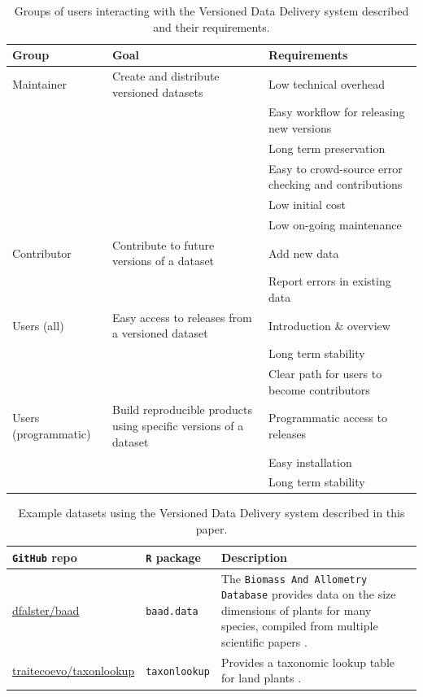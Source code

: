\documentclass[a4paper,11pt]{article}
\newcommand{\ghsmurl}[1]{{\footnotesize\href{https://github.com/#1}{#1}}}
\begin{document}
\begin{table}[h!]
\centering
\caption{Groups of users interacting with the Versioned Data Delivery system described and their requirements.}
{\footnotesize
\vspace{1cm}
  \begin{tabular}{p{2cm}p{5cm}p{7cm}}
  \hline
  \textbf{Group} & \textbf{Goal} & \textbf{Requirements} \\ \hline
  Maintainer & Create and distribute versioned datasets & Low technical overhead \\
    & & Easy workflow for releasing new versions \\
    & & Long term preservation \\
    & & Easy to crowd-source error checking and contributions \\
    & & Low initial cost \\
    & & Low on-going maintenance \\
  Contributor & Contribute to future versions of a dataset & Add new data \\
    & & Report errors in existing data  \\
  Users (all) & Easy access to releases from a versioned dataset & Introduction \& overview \\
    & & Long term stability \\
    & & Clear path for users to become contributors \\
  Users (programmatic) & Build reproducible products using specific versions of a dataset & Programmatic access to releases\\
    & & Easy installation\\
    & & Long term stability \\
  \hline
  \end{tabular}
}
\label{tab:user_requirements}
\end{table}

\newpage

\begin{table}[h!]
\centering
\caption{Example datasets using the Versioned Data Delivery system described in this paper.}
{\footnotesize
\vspace{1cm}

  \begin{tabular}{p{3.5cm}p{3cm}p{7cm}}
  \hline
   \textbf{\texttt{GitHub} repo} & \textbf{\texttt{R} package} & \textbf{Description} \\ \hline
  \ghsmurl{dfalster/baad} & \texttt{baad.data} & The \texttt{Biomass And Allometry Database} provides data on the size dimensions of plants for many species, compiled from multiple scientific papers \citep{Falster-2015}.\\
  \ghsmurl{traitecoevo/taxonlookup} & \texttt{taxonlookup} & Provides a taxonomic lookup table for land plants \citep{Pennell-2015a}.\\
  \hline
  \end{tabular}
  }
\label{tab:examples}
\end{table}
\end{document}
